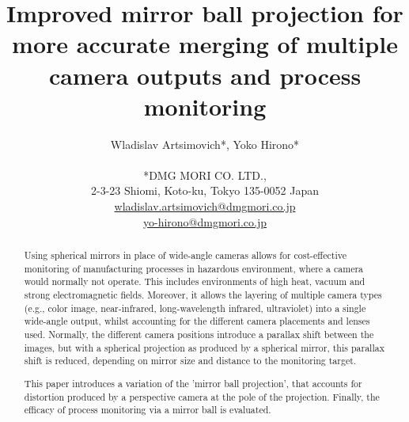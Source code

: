 \documentclass[10pt]{article}
\begin{document}
\title{Improved mirror ball projection for more accurate merging of multiple camera outputs and process monitoring}

\author{Wladislav Artsimovich*, Yoko Hirono* \\
	\\
	*DMG MORI CO. LTD.,\\
	2-3-23 Shiomi, Koto-ku, Tokyo 135-0052 Japan\\
	\href{mailto:wladislav.artsimovich@dmgmori.co.jp}{wladislav.artsimovich@dmgmori.co.jp}  \\
	\href{mailto:wladislav.artsimovich@dmgmori.co.jp}{yo-hirono@dmgmori.co.jp}  \\
}

\maketitle

\begin{abstract}
	Using spherical mirrors in place of wide-angle cameras allows for cost-effective monitoring of manufacturing processes in hazardous environment, where a camera would normally not operate. This includes environments of high heat, vacuum and strong electromagnetic fields. Moreover, it allows the layering of multiple camera types (e.g., color image, near-infrared, long-wavelength infrared, ultraviolet) into a single wide-angle output, whilst accounting for the different camera placements and lenses used. Normally, the different camera positions introduce a parallax shift between the images, but with a spherical projection as produced by a spherical mirror, this parallax shift is reduced, depending on mirror size and distance to the monitoring target.

	This paper introduces a variation of the 'mirror ball projection', that accounts for distortion produced by a perspective camera at the pole of the projection. Finally, the efficacy of process monitoring via a mirror ball is evaluated.
\end{abstract}

\end{document}
